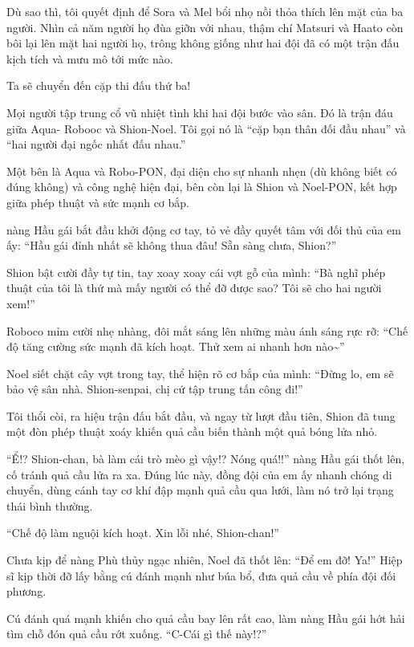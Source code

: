 \documentclass[../main.tex]{subfiles}
\begin{document}
Dù sao thì, tôi quyết định để Sora và Mel bổi nhọ nồi thỏa thích lên mặt của ba người. Nhìn cả năm người họ đùa giỡn với nhau, thậm chí Matsuri và Haato còn bôi lại lên mặt hai người họ, trông không giống như hai đội đã có một trận đấu kịch tích và mưu mô tới mức nào.

Ta sẽ chuyển đến cặp thi đấu thứ ba!

\ct

Mọi người tập trung cổ vũ nhiệt tình khi hai đội bước vào sân. Đó là trận đáu giữa Aqua- Robooc và Shion-Noel. Tôi gọi nó là ``cặp bạn thân đối đầu nhau'' và ``hai người đại ngốc nhất đấu nhau.''

Một bên là Aqua và Robo-PON, đại diện cho sự nhanh nhẹn (dù không biết có đúng không) và công nghệ hiện đại, bên còn lại là Shion và Noel-PON, kết hợp giữa phép thuật và sức mạnh cơ bắp.

nàng Hầu gái bắt đầu khởi động cơ tay, tỏ vẻ đầy quyết tâm với đối thủ của em ấy: ``Hầu gái đỉnh nhất sẽ không thua đâu! Sẵn sàng chưa, Shion?''

Shion bật cười đầy tự tin, tay xoay xoay cái vợt gỗ của mình: ``Bà nghĩ phép thuật của tôi là thứ mà mấy người có thể đỡ được sao? Tôi sẽ cho hai người xem!''

Roboco mỉm cười nhẹ nhàng, đôi mắt sáng lên những màu ánh sáng rực rỡ: ``Chế độ tăng cường sức mạnh đã kích hoạt. Thử xem ai nhanh hơn nào\~{}''

Noel siết chặt cây vợt trong tay, thể hiện rõ cơ bắp của mình: ``Đừng lo, em sẽ bảo vệ sân nhà. Shion-senpai, chị cứ tập trung tấn công đi!''

Tôi thổi còi, ra hiệu trận đấu bắt đầu, và ngay từ lượt đầu tiên, Shion đã tung một đòn phép thuật xoáy khiến quả cầu biến thành một quả bóng lửa nhỏ.

``Ể!? Shion-chan, bà làm cái trò mèo gì vậy!? Nóng quá!!'' nàng Hầu gái thốt lên, cố tránh quả cầu lửa ra xa. Đúng lúc này, đồng đội của em ấy nhanh chóng di chuyển, dùng cánh tay cơ khí đập mạnh quả cầu qua lưới, làm nó trở lại trạng thái bình thường.

``Chế độ làm nguội kích hoạt. Xin lỗi nhé, Shion-chan!''

Chưa kịp để nàng Phù thủy ngạc nhiên, Noel đã thốt lên: ``Để em đỡ! Ya!'' Hiệp sĩ kịp thời đỡ lấy bằng cú đánh mạnh như búa bổ, đưa quả cầu về phía đội đối phương.

Cú đánh quá mạnh khiến cho quả cầu bay lên rất cao, làm nàng Hầu gái hớt hải tìm chỗ đón quả cầu rớt xuống. ``C-Cái gì thế này!?''
\end{document}
